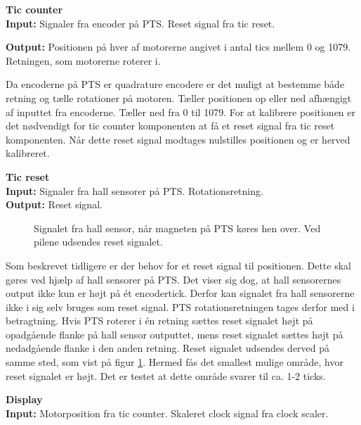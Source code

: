
\textbf{Tic counter}\\
\textbf{Input:}
Signaler fra encoder på PTS. Reset signal fra tic reset.

\textbf{Output:} Positionen på hver af motorerne angivet i antal tics mellem 0 
og 1079. Retningen, som motorerne roterer i. 

Da encoderne på PTS er quadrature encodere er det muligt at bestemme både retning og 
tælle rotationer på motoren.
Tæller positionen op eller ned afhængigt af inputtet fra encoderne. 
Tæller ned fra 0 til 1079.
For at kalibrere positionen er det nødvendigt for tic counter komponenten at få 
et reset signal fra tic reset komponenten. 
Når dette reset signal modtages nulstilles positionen og er herved kalibreret.

\textbf{Tic reset}\\
\textbf{Input:} Signaler fra hall sensorer på PTS. Rotationsretning.\\
\textbf{Output:} Reset signal.

\begin{figure}[!th]
\centering

\caption[Signal fra hall sensor]{Signalet fra hall sensor, når magneten på PTS køres hen over. Ved pilene udsendes reset signalet.}
\label{fig:hall_sensor_signal}
\end{figure}

Som beskrevet tidligere er der behov for et reset signal til positionen. 
Dette skal gøres ved hjælp af hall sensorer på PTS. 
Det viser sig dog, at hall sensorernes output ikke kun er højt på ét encodertick. 
Derfor kan signalet fra hall sensorerne ikke i sig selv bruges som reset signal.
PTS rotationsretningen tages derfor med i betragtning.
Hvis PTS roterer i én retning sættes reset signalet højt på opadgående 
flanke på hall sensor outputtet, mens reset signalet sættes højt på nedadgående 
flanke i den anden retning. Reset signalet udsendes derved på samme sted, som vist på figur \ref{fig:hall_sensor_signal}.
Hermed fås det smallest mulige område, hvor reset signalet er højt.
Det er testet at dette område svarer til ca. 1-2 ticks.

\textbf{Display}\\
\textbf{Input:} Motorposition fra tic counter. Skaleret clock signal fra clock 
scaler.


